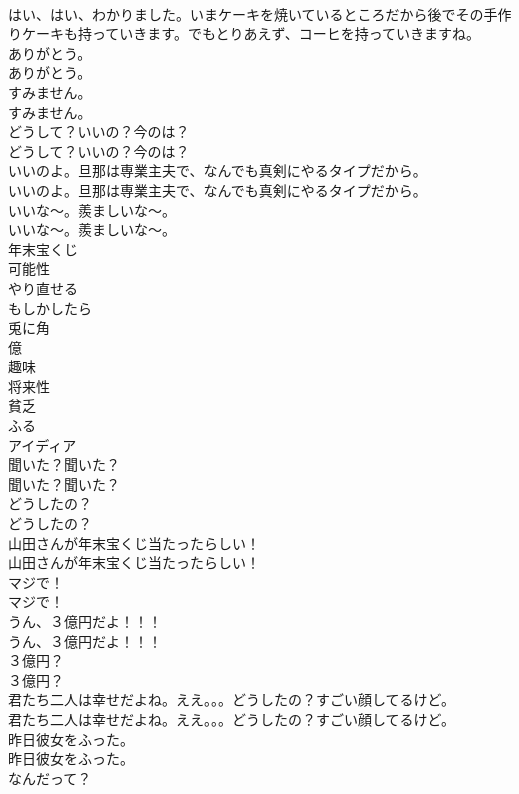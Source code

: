 \documentclass[8pt]{extreport}
\begin{document}
\begin{CJK}{UTF8}{min}
\\	はい、はい、わかりました。いまケーキを焼いているところだから後でその手作りケーキも持っていきます。でもとりあえず、コーヒを持っていきますね。 
\\	ありがとう。	
\\	ありがとう。 
\\	すみません。	
\\	すみません。 
\\	どうして？いいの？今のは？	
\\	どうして？いいの？今のは？ 
\\	いいのよ。旦那は専業主夫で、なんでも真剣にやるタイプだから。	
\\	いいのよ。旦那は専業主夫で、なんでも真剣にやるタイプだから。 
\\	いいな〜。羨ましいな〜。	
\\	いいな〜。羨ましいな〜。 
\\	年末宝くじ
\\	可能性
\\	やり直せる
\\	もしかしたら
\\	兎に角
\\	億
\\	趣味
\\	将来性
\\	貧乏
\\	ふる
\\	アイディア
\\	聞いた？聞いた？	
\\	聞いた？聞いた？ 
\\	どうしたの？	
\\	どうしたの？ 
\\	山田さんが年末宝くじ当たったらしい！	
\\	山田さんが年末宝くじ当たったらしい！ 
\\	マジで！	
\\	マジで！ 
\\	うん、３億円だよ！！！	
\\	うん、３億円だよ！！！ 
\\	３億円？	
\\	３億円？ 
\\	君たち二人は幸せだよね。ええ。。。どうしたの？すごい顔してるけど。	
\\	君たち二人は幸せだよね。ええ。。。どうしたの？すごい顔してるけど。 
\\	昨日彼女をふった。	
\\	昨日彼女をふった。 
\\	なんだって？	

\end{CJK}
\end{document}
